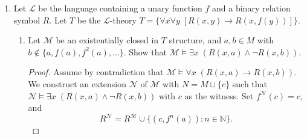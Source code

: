 \documentclass{article}
\begin{document}
\begin{enumerate}[label={\bf Q\arabic*:}]
\begin{proof}
      Let $\lambda$ denote the cardinality of $\mathbb{N}$. Let
      $\mathcal{N}_\lambda\models T'$ be a $\lambda^+$-saturated model of
      cardinality $\leq2^\lambda$. Such a model exists from completeness of
      $T'$ (Theorem 8.11). Then since $\mathcal{M},\mathcal{N}\models T'$
      and $|\mathcal{M}|\leq|\mathcal{N}|=\lambda<\lambda^+$, both
      $\mathcal{M}$ and $\mathcal{N}$ can be elementarily embedded into
      $\mathcal{N}_\lambda$ (Theorem 8.13.1). Then given arbitrary quantifier
      free formula $\varphi(\bar{x},\bar{y})$ and $\bar{m}\in M$, we have
      \begin{align*}
        \mathcal{N}_0\models \exists\bar{x}\; \varphi(\bar{x},\bar{m})
          &\Rightarrow\mathcal{N}\models \exists\bar{x}\;
          \varphi(\bar{x},\bar{m}) &(\because \mathcal{N}_0\leq\mathcal{N})
          \\
          &\Rightarrow\mathcal{N}_\lambda\models \exists\bar{x}\;
            \varphi(\bar{x},\bar{m}) &(\because
            \mathcal{N}\preceq\mathcal{N}_\lambda) \\
          &\Rightarrow\mathcal{M}\models \exists\bar{x}\;
            \varphi(\bar{x},\bar{m}), &(\because
            \mathcal{M}\preceq\mathcal{N}_\lambda) \\
      \end{align*}
      thus $\mathcal{M}\leq_{\text{ec}}\mathcal{N}_0$ as required.
    \end{proof}

  \item Let $\mathcal{L}$ be the language containing a unary function $f$
    and a binary relation symbol $R$. Let $T$ be the $\mathcal{L}$-theory
    $T=\{\forall x\forall y\; [R(x,y)\rightarrow R(x,f(y))]\}$.

    \begin{enumerate}
      \item Let $\mathcal{M}$ be an existentially closed in $T$ structure,
        and $a,b\in M$ with $b\not\in\{a,f(a),f^2(a),\ldots\}$. Show that
        $\mathcal{M}\models \exists x\; (R(x,a)\wedge\neg R(x,b))$.

        \begin{proof}
          Assume by contradiction that $\mathcal{M}\models \forall x\;
          (R(x,a)\rightarrow R(x,b))$. We construct an extension
          $\mathcal{N}$ of $\mathcal{M}$ with $N=M\sqcup\{c\}$
          such that $\mathcal{N}\models \exists x\; (R(x,a)\wedge\neg
          R(x,b))$ with $c$ as the witness. Set $f^\mathcal{N}(c)=c$, and
          \[R^\mathcal{N}= R^\mathcal{M} \cup
          \{(c,f^n(a)):n\in\mathbb{N}\}.\]


\end{proof}
\end{enumerate}
\end{enumerate}
\end{document}
